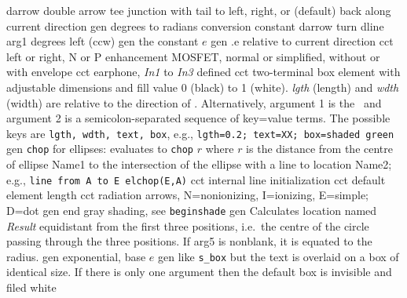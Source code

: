   {darrow}
  {double arrow tee junction with tail to left,
   right, or (default) back along current direction }
  {gen}
  {degrees to radians conversion constant}
  {darrow}
  {turn dline arg1 degrees left (ccw)}
%
  {gen}
  {the constant $e$}
  {gen}
  {.e relative to current direction}
  {cct}
  {left or right, N or P enhancement MOSFET, normal
   or simplified, without or with envelope
    }
  {cct}
  {earphone, {\sl In1} to {\sl In3} defined
   }
  {cct}
  { two-terminal box element with adjustable dimensions and fill
   value 0 (black) to 1 (white). {\sl lgth} (length) and {\sl wdth} (width)
   are relative
   to the direction of \linespec. Alternatively, argument 1 is the
   \linespec\ and argument 2 is a semicolon-separated sequence of key=value
   terms.  The possible keys are {\tt lgth, wdth, text, box},
   e.g., {\tt lgth=0.2; text=XX;
     box=shaded green}}
  {gen}
  {{\tt chop} for ellipses: evaluates to {\tt chop} $r$ where $r$ is
    the distance from the centre of ellipse Name1 to the intersection of
    the ellipse with a line to location Name2;
    e.g., {\tt line from A to E elchop(E,A)}}
  {cct}
  {internal line initialization}
  {cct}
  {default element length}
  {cct}
  {radiation arrows, N=nonionizing, I=ionizing, E=simple;
     D=dot}
  {gen}
  {end gray shading, see {\tt beginshade}}
  {gen}
  {Calculates location named {\sl Result} equidistant from the first three
   positions, i.e.\ the centre of the circle passing through the three
   positions.  If arg5 is nonblank, it is equated to the radius.}
  {gen}
  {exponential, base $e$}
%
  {gen}
  {like {\tt s\_box} but the text is overlaid on a box of identical size.
   If there is only one argument then the default box
   is invisible and filed white
    }
